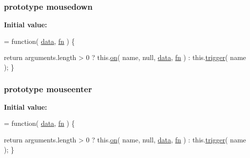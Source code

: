 \hypertarget{jquery-1_810_82-vsdoc_8js_ad995651a26de4e6b051bbbeff5591c79}{}
\subsubsection[{mousedown}]{ {\bf prototype} mousedown}\label{jquery-1_810_82-vsdoc_8js_ad995651a26de4e6b051bbbeff5591c79}
{\bfseries Initial value\+:}
\begin{DoxyCode}
= \textcolor{keyword}{function}( \hyperlink{jquery-1_810_82-vsdoc_8js_a609407b3456fdc3c5671a9fc4a226ff7}{data}, \hyperlink{jquery-1_810_82-vsdoc_8js_acef6bdaf6b9b20fdcca1ea86f0902c3b}{fn} ) \{


        \textcolor{keywordflow}{return} arguments.length > 0 ?
            this.\hyperlink{jquery-1_810_82-vsdoc_8js_ae453b412b883f60220d73468ef6c6dbc}{on}( name, null, \hyperlink{jquery-1_810_82-vsdoc_8js_a609407b3456fdc3c5671a9fc4a226ff7}{data}, \hyperlink{jquery-1_810_82-vsdoc_8js_acef6bdaf6b9b20fdcca1ea86f0902c3b}{fn} ) :
            this.\hyperlink{jquery-1_810_82-vsdoc_8js_a2388c4114d5e3e4eab020f973641519c}{trigger}( name );
    \}
\end{DoxyCode}
\hypertarget{jquery-1_810_82-vsdoc_8js_a762f67ea0a9dd89f27dbe2b23d9f91b9}{}
\subsubsection[{mouseenter}]{ {\bf prototype} mouseenter}\label{jquery-1_810_82-vsdoc_8js_a762f67ea0a9dd89f27dbe2b23d9f91b9}
{\bfseries Initial value\+:}
\begin{DoxyCode}
= \textcolor{keyword}{function}( \hyperlink{jquery-1_810_82-vsdoc_8js_a609407b3456fdc3c5671a9fc4a226ff7}{data}, \hyperlink{jquery-1_810_82-vsdoc_8js_acef6bdaf6b9b20fdcca1ea86f0902c3b}{fn} ) \{


        \textcolor{keywordflow}{return} arguments.length > 0 ?
            this.\hyperlink{jquery-1_810_82-vsdoc_8js_ae453b412b883f60220d73468ef6c6dbc}{on}( name, null, \hyperlink{jquery-1_810_82-vsdoc_8js_a609407b3456fdc3c5671a9fc4a226ff7}{data}, \hyperlink{jquery-1_810_82-vsdoc_8js_acef6bdaf6b9b20fdcca1ea86f0902c3b}{fn} ) :
            this.\hyperlink{jquery-1_810_82-vsdoc_8js_a2388c4114d5e3e4eab020f973641519c}{trigger}( name );
    \}
\end{DoxyCode}
\hypertarget{jquery-1_810_82-vsdoc_8js_a97f1b922fe119361e2016713603fbbab}{}
